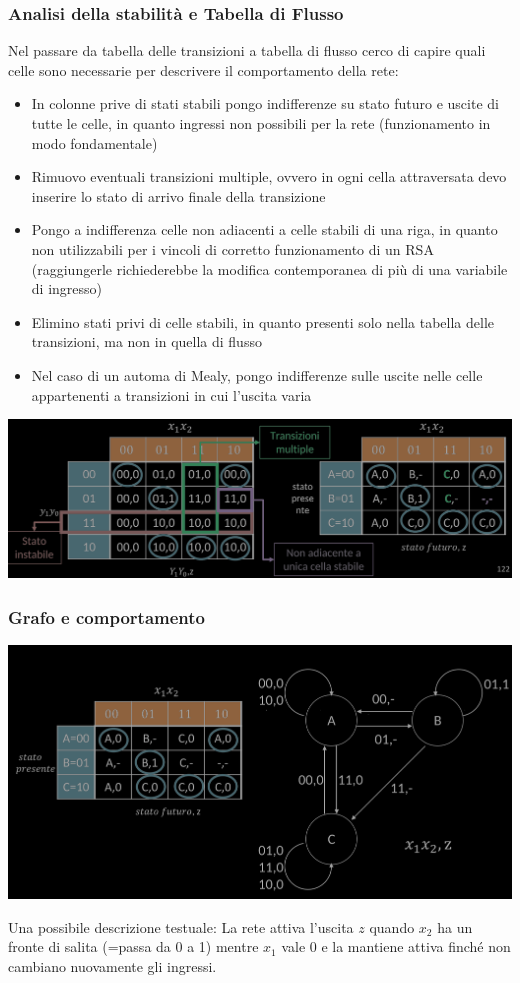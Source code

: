 \documentclass{article}
\begin{document}
\subsubsection*{Analisi della stabilità e Tabella di Flusso}
Nel passare da tabella delle transizioni a tabella di flusso cerco di capire quali celle sono necessarie per descrivere il comportamento della rete:

\begin{itemize}
    \item In colonne prive di stati stabili pongo indifferenze su stato futuro e uscite di tutte le celle, in quanto ingressi non possibili per la rete (funzionamento in modo fondamentale)
    \item Rimuovo eventuali transizioni multiple, ovvero in ogni cella attraversata devo inserire lo stato di arrivo finale della transizione
    \item Pongo a indifferenza celle non adiacenti a celle stabili di una riga, in quanto non utilizzabili per i vincoli di corretto funzionamento di un RSA (raggiungerle richiederebbe la modifica contemporanea di più di una variabile di ingresso)
    \item Elimino stati privi di celle stabili, in quanto presenti solo nella tabella delle transizioni, ma non in quella di flusso
    \item Nel caso di un automa di Mealy, pongo indifferenze sulle uscite nelle celle appartenenti a transizioni in cui l’uscita varia
\end{itemize}
\begin{center}
    \includegraphics[scale=0.37]{analisiStabilita.png}
\end{center}
\subsubsection*{Grafo e comportamento}
\begin{center}
    \includegraphics[scale=0.37]{grafoecomportamento.png}
\end{center}
Una possibile descrizione testuale: La rete attiva l’uscita $z$ quando $x_2$ ha un fronte di salita (=passa da 0 a 1) mentre $x_1$ vale 0 e la mantiene attiva finché non cambiano nuovamente gli ingressi.
\end{document}
